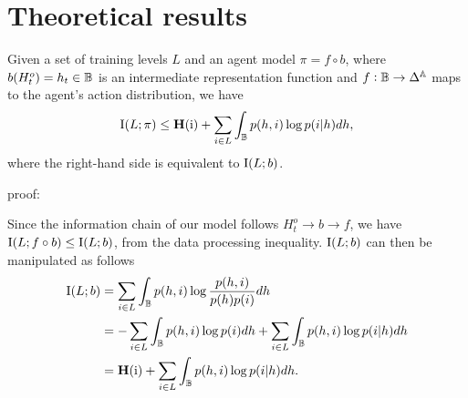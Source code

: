 
% 

% 
% 


\section{Theoretical results}\label{c3:app:proofs}

\begin{lemma}
    Given a set of training levels $L$ and an agent model $\pi = f \circ b$, where $b(H^o_t) = h_t \in {\mathbb{B}}$ is an intermediate representation function and $f : {\mathbb{B}} \rightarrow \Delta^{\mathbb{A}}$ maps to the agent's action distribution, we have
    \begin{align}
        \text{I}(L;\pi) \leq \mathbf{H}({\textnormal{i}}) + \sum_{i\in L} \int_{{\mathbb{B}}} p(h, i) \log p(i|h)dh,
    \end{align}
    where the right-hand side is equivalent to $\text{I}(L;b)$.

    proof:
    
    Since the information chain of our model follows $H_t^o \rightarrow b \rightarrow f$, we have $\text{I}(L;f \circ b) \leq \text{I}(L;b)$, from the data processing inequality. $\text{I}(L;b)$ can then be manipulated as follows
    \begin{align}\label{c3:eq:proof_mi_kld}
        \text{I}(L;b) &= \sum_{i \in L} \int_{{\mathbb{B}}} p(h,i) \log \frac{p(h,i)}{p(h)p(i)}dh \\
        &= - \sum_{i \in L} \int_{{\mathbb{B}}} p(h,i) \log p(i) dh + \sum_{i \in L} \int_{{\mathbb{B}}} p(h, i) \log p(i|h) dh \\
        &= \mathbf{H}({\textnormal{i}}) + \sum_{i\in L} \int_{{\mathbb{B}}} p(h, i) \log p(i|h)dh.
    \end{align}

\end{lemma}


